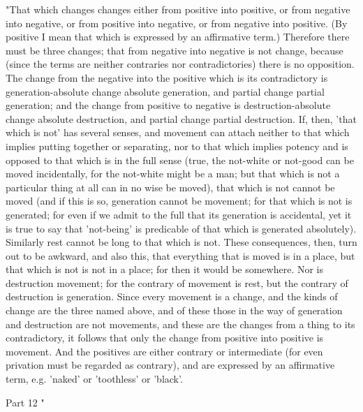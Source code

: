 "That which changes changes either from positive into positive, or
from negative into negative, or from positive into negative, or from
negative into positive. (By positive I mean that which is expressed
by an affirmative term.) Therefore there must be three changes; that
from negative into negative is not change, because (since the terms
are neither contraries nor contradictories) there is no opposition.
The change from the negative into the positive which is its contradictory
is generation-absolute change absolute generation, and partial change
partial generation; and the change from positive to negative is destruction-absolute
change absolute destruction, and partial change partial destruction.
If, then, 'that which is not' has several senses, and movement can
attach neither to that which implies putting together or separating,
nor to that which implies potency and is opposed to that which is
in the full sense (true, the not-white or not-good can be moved incidentally,
for the not-white might be a man; but that which is not a particular
thing at all can in no wise be moved), that which is not cannot be
moved (and if this is so, generation cannot be movement; for that
which is not is generated; for even if we admit to the full that its
generation is accidental, yet it is true to say that 'not-being' is
predicable of that which is generated absolutely). Similarly rest
cannot be long to that which is not. These consequences, then, turn
out to be awkward, and also this, that everything that is moved is
in a place, but that which is not is not in a place; for then it would
be somewhere. Nor is destruction movement; for the contrary of movement
is rest, but the contrary of destruction is generation. Since every
movement is a change, and the kinds of change are the three named
above, and of these those in the way of generation and destruction
are not movements, and these are the changes from a thing to its contradictory,
it follows that only the change from positive into positive is movement.
And the positives are either contrary or intermediate (for even privation
must be regarded as contrary), and are expressed by an affirmative
term, e.g. 'naked' or 'toothless' or 'black'. 

Part 12 "

